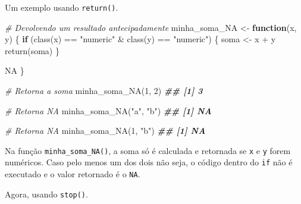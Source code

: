 \documentclass[
]{book}
\newenvironment{Shaded}{\begin{snugshade}}{\end{snugshade}}
\newcommand{\CommentTok}[1]{\textcolor[rgb]{0.56,0.35,0.01}{\textit{#1}}}
\newcommand{\ConstantTok}[1]{\textcolor[rgb]{0.00,0.00,0.00}{#1}}
\newcommand{\ControlFlowTok}[1]{\textcolor[rgb]{0.13,0.29,0.53}{\textbf{#1}}}
\newcommand{\DecValTok}[1]{\textcolor[rgb]{0.00,0.00,0.81}{#1}}
\newcommand{\DocumentationTok}[1]{\textcolor[rgb]{0.56,0.35,0.01}{\textbf{\textit{#1}}}}
\newcommand{\FunctionTok}[1]{\textcolor[rgb]{0.00,0.00,0.00}{#1}}
\newcommand{\NormalTok}[1]{#1}
\newcommand{\OtherTok}[1]{\textcolor[rgb]{0.56,0.35,0.01}{#1}}
\newcommand{\SpecialCharTok}[1]{\textcolor[rgb]{0.00,0.00,0.00}{#1}}
\newcommand{\StringTok}[1]{\textcolor[rgb]{0.31,0.60,0.02}{#1}}
\begin{document}
Um exemplo usando \texttt{return()}.

\begin{Shaded}
\begin{Highlighting}[]
\CommentTok{\# Devolvendo um resultado antecipadamente}
\NormalTok{minha\_soma\_NA }\OtherTok{\textless{}{-}} \ControlFlowTok{function}\NormalTok{(x, y) \{}
  \ControlFlowTok{if}\NormalTok{ (}\FunctionTok{class}\NormalTok{(x) }\SpecialCharTok{==} \StringTok{"numeric"} \SpecialCharTok{\&} \FunctionTok{class}\NormalTok{(y) }\SpecialCharTok{==} \StringTok{"numeric"}\NormalTok{) \{}
\NormalTok{     soma }\OtherTok{\textless{}{-}}\NormalTok{ x }\SpecialCharTok{+}\NormalTok{ y}
     \FunctionTok{return}\NormalTok{(soma)}
\NormalTok{  \}}
  
  \ConstantTok{NA}
\NormalTok{\}}

\CommentTok{\# Retorna a soma}
\FunctionTok{minha\_soma\_NA}\NormalTok{(}\DecValTok{1}\NormalTok{, }\DecValTok{2}\NormalTok{)}
\DocumentationTok{\#\# [1] 3}

\CommentTok{\# Retorna NA}
\FunctionTok{minha\_soma\_NA}\NormalTok{(}\StringTok{"a"}\NormalTok{, }\StringTok{"b"}\NormalTok{)}
\DocumentationTok{\#\# [1] NA}

\CommentTok{\# Retorna NA}
\FunctionTok{minha\_soma\_NA}\NormalTok{(}\DecValTok{1}\NormalTok{, }\StringTok{"b"}\NormalTok{)}
\DocumentationTok{\#\# [1] NA}
\end{Highlighting}
\end{Shaded}

Na função \texttt{minha\_soma\_NA()}, a soma só é calculada e retornada se \texttt{x} e \texttt{y} forem numéricos. Caso pelo menos um dos dois não seja, o código dentro do \texttt{if} não é executado e o valor retornado é o \texttt{NA}.

Agora, usando \texttt{stop()}.
\end{document}
